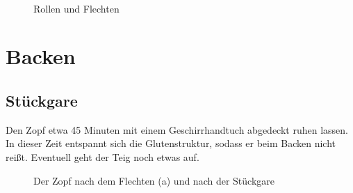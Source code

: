 \documentclass[a4paper, oneside]{recipe}
\begin{document}
\begin{figure}[h]
  \centering
  \quad
   \\
  \quad
  \caption{Rollen und Flechten}
  \label{fig:flechten}
\end{figure}

\section*{Backen}
\subsection*{Stückgare}
Den Zopf etwa 45 Minuten mit einem Geschirrhandtuch abgedeckt ruhen lassen. In dieser Zeit entspannt sich die Glutenstruktur, sodass er beim Backen nicht reißt. Eventuell geht der Teig noch etwas auf.

\begin{figure}[!ht]
  \centering
  \quad
  \label{fig:vor_nach_stueckgare}
  \caption{Der Zopf nach dem Flechten (a) und nach der Stückgare}
\end{figure}
\end{document}
